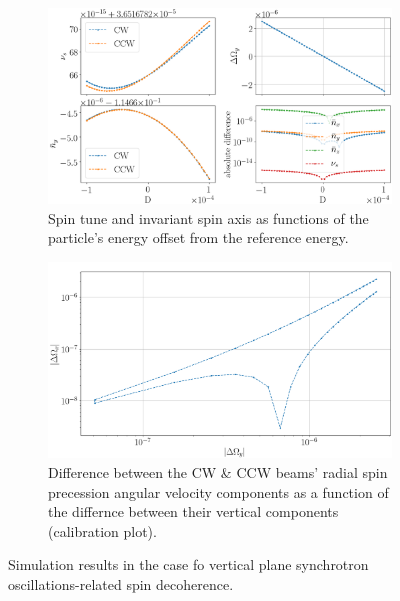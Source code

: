 \begin{figure}[h]
  \centering
  \begin{subfigure}{\linewidth}
    \includegraphics[width=\linewidth]{images/GFF/GFF_stune_range_D}
    \caption{Spin tune and invariant spin axis as functions of the particle's
      energy offset from the reference energy.\label{fig:D:calib_plot:stune}}
  \end{subfigure}
  \begin{subfigure}{\linewidth}
    \includegraphics[width=\linewidth]{images/GFF/GFF_omegas_range_D}
    \caption{Difference between the CW \& CCW beams' radial spin precession angular velocity components
      as a function of the differnce between their vertical components
      (calibration plot).\label{fig:D:calib_plot:omegas}}
  \end{subfigure}    
  \caption{Simulation results in the case fo vertical plane synchrotron oscillations-related
    spin decoherence.\label{fig:D:calib_plot}}
\end{figure}
